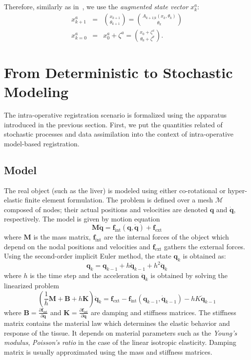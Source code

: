 \documentclass[paper=a4, fontsize=11pt]{article}
\def\ie{i.\,e.}
\def\msh{\mathcal{M}}
\def\pos{\mathbf{q}}
\def\vel{\mathbf{\dot{q}}}
\def\acc{\mathbf{\ddot{q}}}
\def\mass{\mathbf{M}}
\def\damp{\mathbf{B}}
\def\stiff{\mathbf{K}}
\def\fext{\mathbf{f}_{\text{ext}}}
\def\fint{\mathbf{f}_{\text{int}}}
\begin{document}
Therefore, similarly as in~\cite{moireau2011reduced,wu2007application}, we use the \emph{augmented state vector} $x^a_k$:
\begin{eqnarray}
x^a_{k+1} &=& \displaystyle\binom{x_{k+1}}{\theta_{k+1}}  = \displaystyle\binom{A_{k+1|k}(x_k,\theta_k)}{\theta_{k}} \\
x^a_{k=0} &=& x_0^a + \zeta^a = \displaystyle\binom{x_0 + \zeta^x}{\theta_0 + \zeta^\theta}.
\label{eq:aug}
\end{eqnarray}


\section{From Deterministic to Stochastic Modeling}
The intra-operative registration scenario is formalized using the apparatus introduced in the previous 
section. First, we put the quantities related of stochastic processes and data assimilation into the context
of intra-operative model-based registration. 

\subsection{Model}
\label{ss:model}
The real object (such as the liver) is modeled using either co-rotational or hyper-elastic
finite element formulation. The problem is defined over a mesh $\msh$ composed of nodes; their actual 
positions and velocities are denoted $\pos$ and $\vel$, respectively. The model is given by motion equation
\begin{equation}
\mass\acc = \fint(\pos,\vel) + \fext
\end{equation}
where $\mass$ is the mass matrix, $\fint$ are the internal forces of the object which depend on 
the nodal positions and velocities and $\fext$ gathers the external forces. 
Using the second-order implicit Euler method, the state $\pos_k$ is obtained as:
\begin{equation}
\pos_k = \pos_{k-1} + h\vel_{k-1} + h^2\acc_{k}
\label{eq:integ}
\end{equation}
where $h$ is the time step and the acceleration $\acc_k$ is obtained by solving the linearized problem
\begin{equation}
(\frac{1}{h}\mass + \damp + h\stiff)\acc_k = \fext - \fint(\pos_{k-1},\vel_{k-1}) - hK\vel_{k-1}
\label{eq:accel}
\end{equation}
where $\damp = \frac{\partial \fint}{\partial\pos}$ and $\stiff = \frac{\partial \fint}{\partial\vel}$
are damping and stiffness matrices. The stiffness matrix contains the material law which determines the 
elastic behavior and response of the tissue. It depends on material parameters such as the \emph{Young's modulus}, 
\emph{Poisson's ratio} in the case of the linear isotropic elasticity. 
Damping matrix is usually approximated using the mass and stiffness matrices.
\end{document}
